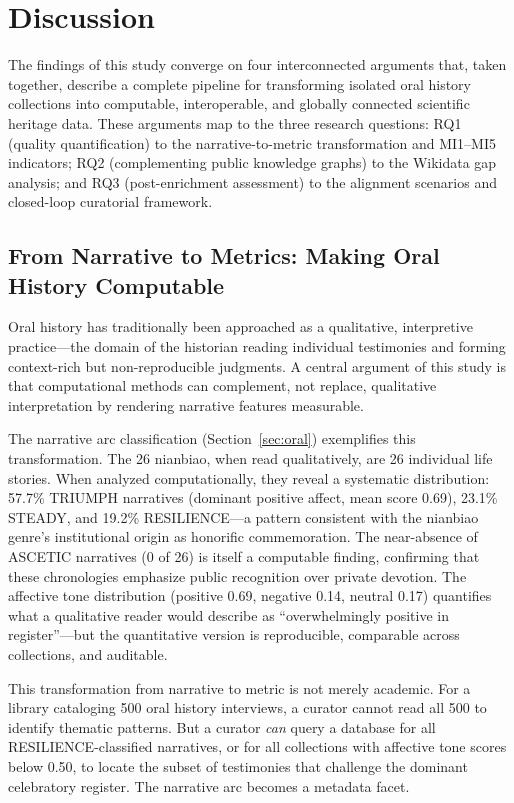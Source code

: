 \documentclass[review]{elsarticle}
\begin{document}
\section{Discussion}

The findings of this study converge on four interconnected arguments that, taken together, describe a complete pipeline for transforming isolated oral history collections into computable, interoperable, and globally connected scientific heritage data. These arguments map to the three research questions: RQ1 (quality quantification) to the narrative-to-metric transformation and MI1--MI5 indicators; RQ2 (complementing public knowledge graphs) to the Wikidata gap analysis; and RQ3 (post-enrichment assessment) to the alignment scenarios and closed-loop curatorial framework.

\subsection{From Narrative to Metrics: Making Oral History Computable}

Oral history has traditionally been approached as a qualitative, interpretive practice---the domain of the historian reading individual testimonies and forming context-rich but non-reproducible judgments. A central argument of this study is that computational methods can complement, not replace, qualitative interpretation by rendering narrative features measurable.

The narrative arc classification (Section~\ref{sec:oral}) exemplifies this transformation. The 26 nianbiao, when read qualitatively, are 26 individual life stories. When analyzed computationally, they reveal a systematic distribution: 57.7\% TRIUMPH narratives (dominant positive affect, mean score 0.69), 23.1\% STEADY, and 19.2\% RESILIENCE---a pattern consistent with the nianbiao genre's institutional origin as honorific commemoration. The near-absence of ASCETIC narratives (0 of 26) is itself a computable finding, confirming that these chronologies emphasize public recognition over private devotion. The affective tone distribution (positive 0.69, negative 0.14, neutral 0.17) quantifies what a qualitative reader would describe as ``overwhelmingly positive in register''---but the quantitative version is reproducible, comparable across collections, and auditable.

This transformation from narrative to metric is not merely academic. For a library cataloging 500 oral history interviews, a curator cannot read all 500 to identify thematic patterns. But a curator \textit{can} query a database for all RESILIENCE-classified narratives, or for all collections with affective tone scores below 0.50, to locate the subset of testimonies that challenge the dominant celebratory register. The narrative arc becomes a metadata facet.
\end{document}
